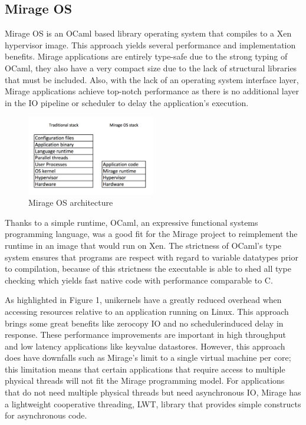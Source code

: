 \documentclass[english,10pt,twocolumn]{article}
\begin{document}
\subsection{Mirage OS}

Mirage OS is an OCaml based library operating system that compiles to a Xen hypervisor image.
This approach yields several performance and implementation benefits.
Mirage applications are entirely type-safe due to the strong typing of OCaml, they also have a very compact size due to the lack of structural libraries that must be included.
Also, with the lack of an operating system interface layer, Mirage applications achieve top-notch performance as there is no additional layer in the IO pipeline or scheduler to delay the application's execution.

\begin{figure}[ht]
  \centering
  \caption{Mirage OS architecture}
  \includegraphics[width=0.5\textwidth]{images/design}
\end{figure}

Thanks to a simple runtime, OCaml, an expressive functional systems programming language, was a good fit for the Mirage project to reimplement the runtime in an image that would run on Xen.
The strictness of OCaml's type system ensures that programs are respect with regard to variable datatypes prior to compilation, because of this strictness the executable is able to shed all type checking which yields fast native code with performance comparable to C.

As highlighted in Figure 1, unikernels have a greatly reduced overhead when accessing resources relative to an application running on Linux.
This approach brings some great benefits like zero\-copy IO and no scheduler\-induced delay in response.
These performance improvements are important in high throughput and low latency applications like key\-value datastores.
However, this approach does have downfalls such as Mirage's limit to a single virtual machine per core; this limitation means that certain applications that require access to multiple physical threads will not fit the Mirage programming model.
For applications that do not need multiple physical threads but need asynchronous IO, Mirage has a lightweight cooperative threading, LWT, library that provides simple constructs for asynchronous code.
\end{document}
